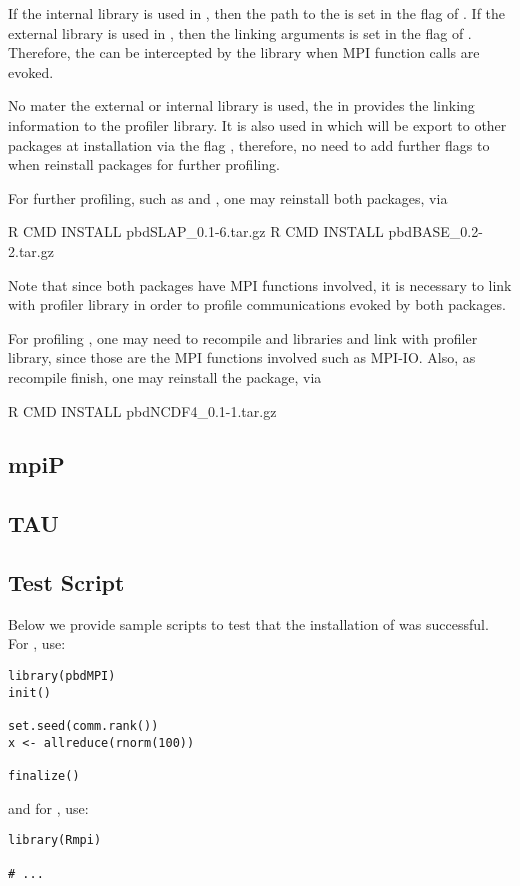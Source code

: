 If the internal library is used in ,
then the path to the  is set in the flag
 of .
If the external library is used in ,
then the linking arguments  is set
in the flag  of .
Therefore, the  can be intercepted by the  library
when MPI function calls are evoked.

No mater the external or internal library is used, the 
in  provides the linking information to the
profiler library. It is also used in  which will be
export to other  packages at installation via the flag
, therefore, no need to add further flags to
 when reinstall packages for further profiling.

For further profiling, such as  and , one may
reinstall both packages, via
\begin{Command}
R CMD INSTALL pbdSLAP_0.1-6.tar.gz
R CMD INSTALL pbdBASE_0.2-2.tar.gz
\end{Command}
Note that since both packages have MPI  functions involved, it
is necessary to link with profiler library in order to profile communications
evoked by both packages.

For profiling , one may need to recompile  and
 libraries and link with profiler library, since those are
the MPI functions involved such as MPI-IO. Also, as recompile finish, one may
reinstall the package, via
\begin{Command}
R CMD INSTALL pbdNCDF4_0.1-1.tar.gz
\end{Command}


\subsection{mpiP}
\label{sec:mpiP}


\subsection{TAU}
\label{sec:TAU}


\subsection{Test Script}

Below we provide sample scripts to test that the installation of  was successful.  For , use:
\begin{lstlisting}[title=Test script for pbdMPI]
library(pbdMPI)
init()

set.seed(comm.rank())
x <- allreduce(rnorm(100))

finalize()
\end{lstlisting}
and for , use:
\begin{lstlisting}[title=Test script for pbdMPI]
library(Rmpi)

# ...
\end{lstlisting}
